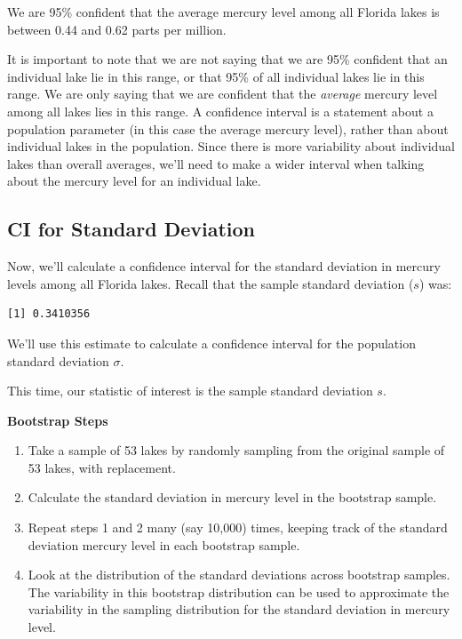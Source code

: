 \documentclass[
  letterpaper,
  DIV=11,
  numbers=noendperiod]{scrreprt}
\newenvironment{Shaded}{\begin{snugshade}}{\end{snugshade}}
\newcommand{\FunctionTok}[1]{\textcolor[rgb]{0.28,0.35,0.67}{#1}}
\newcommand{\NormalTok}[1]{\textcolor[rgb]{0.00,0.23,0.31}{#1}}
\newcommand{\OtherTok}[1]{\textcolor[rgb]{0.00,0.23,0.31}{#1}}
\newcommand{\SpecialCharTok}[1]{\textcolor[rgb]{0.37,0.37,0.37}{#1}}
\begin{document}
We are 95\% confident that the average mercury level among all Florida
lakes is between 0.44 and 0.62 parts per million.

It is important to note that we are not saying that we are 95\%
confident that an individual lake lie in this range, or that 95\% of all
individual lakes lie in this range. We are only saying that we are
confident that the \emph{average} mercury level among all lakes lies in
this range. A confidence interval is a statement about a population
parameter (in this case the average mercury level), rather than about
individual lakes in the population. Since there is more variability
about individual lakes than overall averages, we'll need to make a wider
interval when talking about the mercury level for an individual lake.

\subsection{CI for Standard Deviation}\label{ci-for-standard-deviation}

Now, we'll calculate a confidence interval for the standard deviation in
mercury levels among all Florida lakes. Recall that the sample standard
deviation (\(s\)) was:

\begin{Shaded}
\end{Shaded}

\begin{verbatim}
[1] 0.3410356
\end{verbatim}

We'll use this estimate to calculate a confidence interval for the
population standard deviation \(\sigma\).

This time, our statistic of interest is the sample standard deviation
\(s\).

\textbf{Bootstrap Steps}

\begin{enumerate}
\def\labelenumi{\arabic{enumi}.}
\item
  Take a sample of 53 lakes by randomly sampling from the original
  sample of 53 lakes, with replacement.
\item
  Calculate the standard deviation in mercury level in the bootstrap
  sample.
\item
  Repeat steps 1 and 2 many (say 10,000) times, keeping track of the
  standard deviation mercury level in each bootstrap sample.
\item
  Look at the distribution of the standard deviations across bootstrap
  samples. The variability in this bootstrap distribution can be used to
  approximate the variability in the sampling distribution for the
  standard deviation in mercury level.
\end{enumerate}
\end{document}
